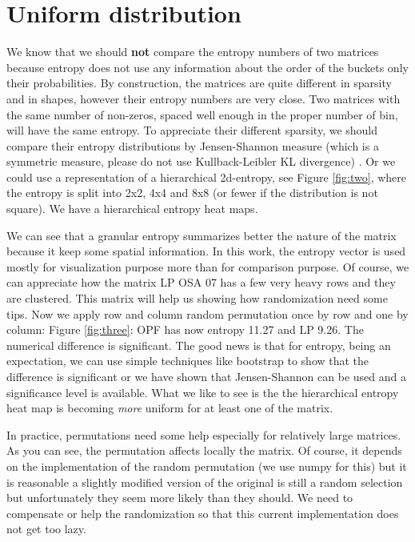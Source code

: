 \documentclass[manuscript,screen]{acmart}
\begin{document}
\section{Uniform distribution}
\label{sec:uniform}
We know that we should {\bf not} compare the entropy numbers of two
matrices because entropy does not use any information about the order
of the buckets only their probabilities. By construction, the matrices
are quite different in sparsity and in shapes, however their entropy
numbers are very close.  Two matrices with the same number of
non-zeros, spaced well enough in the proper number of bin, will have
the same entropy. To appreciate their different sparsity, we should
compare their entropy distributions by Jensen-Shannon measure (which
is a symmetric measure, please do not use Kullback-Leibler KL
divergence) \cite{dalberto2012nonparametric}. Or we could use a representation of a hierarchical
2d-entropy, see Figure \ref{fig:two}, where the entropy is split into
2x2, 4x4 and 8x8 (or fewer if the distribution is not square). We have
a hierarchical entropy heat maps.


We can see that a granular entropy summarizes better the nature of the
matrix because it keep some spatial information. In this work, the
entropy vector is used mostly for visualization purpose more than for
comparison purpose. Of course, we can appreciate how the matrix LP OSA
07 has a few very heavy rows and they are clustered. This matrix will
help us showing how randomization need some tips. Now we apply row and
column random permutation once by row and one by column: Figure
\ref{fig:three}: OPF has now entropy 11.27 and LP 9.26. The numerical
difference is significant. The good news is that for entropy, being an
expectation, we can use simple techniques like bootstrap to show that
the difference is significant or we have shown that Jensen-Shannon can
be used and a significance level is available. What we like to see is
the the hierarchical entropy heat map is becoming {\em more} uniform
for at least one of the matrix.


In practice, permutations need some help especially for relatively
large matrices. As you can see, the permutation affects locally the
matrix. Of course, it depends on the implementation of the random
permutation (we use numpy for this) but it is reasonable a slightly
modified version of the original is still a random selection but
unfortunately they seem more likely than they should. We need to
compensate or help the randomization so that this current
implementation does not get too lazy.
\end{document}
